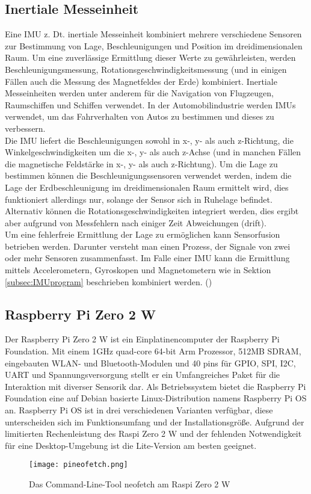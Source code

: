 \subsection{Inertiale Messeinheit}
\label{subsec:tIMU}
Eine \ac{IMU} z. Dt. inertiale Messeinheit kombiniert mehrere verschiedene Sensoren zur Bestimmung von Lage, Beschleunigungen und Position im dreidimensionalen Raum. Um eine zuverlässige Ermittlung dieser Werte zu gewährleisten, werden Beschleunigungsmessung, Rotationsgeschwindigkeitsmessung (und in einigen Fällen auch die Messung des Magnetfeldes der Erde) kombiniert. Inertiale Messeinheiten werden unter anderem für die Navigation von Flugzeugen, Raumschiffen und Schiffen verwendet. In der Automobilindustrie werden \ac{IMU}s verwendet, um das Fahrverhalten von Autos zu bestimmen und dieses zu verbessern.\\
Die \ac{IMU} liefert die Beschleunigungen sowohl in x-, y- als auch z-Richtung, die Winkelgeschwindigkeiten um die x-, y- als auch z-Achse (und in manchen Fällen die magnetische Feldstärke in x-, y- als auch z-Richtung). Um die Lage zu bestimmen können die Beschleunigungssensoren verwendet werden, indem die Lage der Erdbeschleunigung im dreidimensionalen Raum ermittelt wird, dies funktioniert allerdings nur, solange der Sensor sich in Ruhelage befindet. Alternativ können die Rotationsgeschwindigkeiten integriert werden, dies ergibt aber aufgrund von Messfehlern nach einiger Zeit Abweichungen (drift).\\ Um eine fehlerfreie Ermittlung der Lage zu ermöglichen kann Sensorfusion betrieben werden. Darunter versteht man einen Prozess, der Signale von zwei oder mehr Sensoren zusammenfasst. Im Falle einer \ac{IMU} kann die Ermittlung mittels Accelerometern, Gyroskopen und Magnetometern wie in Sektion \ref{subsec:IMUprogram} beschrieben kombiniert werden.
(\cite{UCAM-CL-TR-696})

\subsection{Raspberry Pi Zero 2 W}
\label{subsec:RasPi}
Der Raspberry Pi Zero 2 W ist ein Einplatinencomputer der Raspberry Pi Foundation. Mit einem 1GHz quad-core 64-bit Arm Prozessor, 512MB SDRAM, eingebauten WLAN- und Bluetooth-Modulen und 40 pins für GPIO, SPI, I2C, UART und Spannungsversorgung stellt er ein Umfangreiches Paket für die Interaktion mit diverser Sensorik dar. Als Betriebssystem bietet die Raspberry Pi Foundation eine auf Debian basierte Linux-Distribution namens Raspberry Pi OS an. Raspberry Pi OS ist in drei verschiedenen Varianten verfügbar, diese unterscheiden sich im Funktionsumfang und der Installationsgröße. Aufgrund der limitierten Rechenleistung des \ac{Raspi} Zero 2 W und der fehlenden Notwendigkeit für eine Desktop-Umgebung ist die Lite-Version am besten geeignet.
\begin{figure}[h]
\centering
\texttt{[image: pineofetch.png]}
\caption{Das Command-Line-Tool neofetch am \ac{Raspi} Zero 2 W}
\label{fig:pineofetch}
\end{figure}

